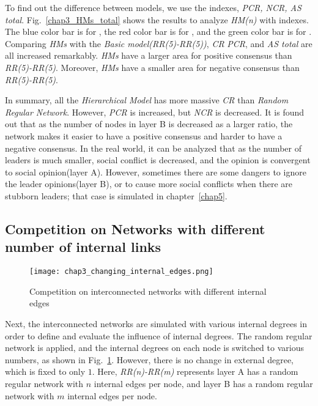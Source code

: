To find out the difference between models, we use the indexes, \textit{PCR, NCR, AS total}. Fig.~\ref{chap3_HMs_total} shows the results to analyze \textit{HM(n)} with indexes. The blue color bar is for , the red color bar is for , and the green color bar is for . Comparing \textit{HMs} with the \textit{Basic model(RR(5)-RR(5))}, \textit{CR} \textit{PCR}, and \textit{AS total} are all increased remarkably. \textit{HMs} have a larger area for positive consensus than \textit{RR(5)-RR(5)}. Moreover, \textit{HMs} have a smaller area for negative consensus than \textit{RR(5)-RR(5)}. 

In summary, all the \textit{Hierarchical Model} has more massive \textit{CR} than \textit{Random Regular Network}. However, \textit{PCR} is increased, but \textit{NCR} is decreased. It is found out that as the number of nodes in layer B is decreased as a larger ratio, the network makes it easier to have a positive consensus and harder to have a negative consensus. In the real world, it can be analyzed that as the number of leaders is much smaller, social conflict is decreased, and the opinion is convergent to social opinion(layer A). However, sometimes there are some dangers to ignore the leader opinions(layer B), or to cause more social conflicts when there are stubborn leaders; that case is simulated in chapter~\ref{chap5}. \\

\subsection{Competition on Networks with different number of internal links}

\begin{figure}[!htb]
	\centering
	\texttt{[image: chap3\_changing\_internal\_edges.png]}
	\caption{Competition on interconnected networks with different internal edges}
	\label{chap3_changing_internal_edges}
\end{figure}

Next, the interconnected networks are simulated with various internal degrees in order to define and evaluate the influence of internal degrees. The random regular network is applied, and the internal degrees on each node is switched to various numbers, as shown in Fig.~\ref{chap3_changing_internal_edges}. However, there is no change in external degree, which is fixed to only $1$. Here, \textit{RR(n)-RR(m)} represents layer A has a random regular network with $n$ internal edges per node, and layer B has a random regular network with $m$ internal edges per node.

